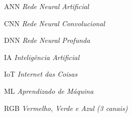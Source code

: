 \documentclass[
	12pt,				%
	oneside,
	a4paper,			%
	chapter=TITLE,
	english,			%
	brazil,				%
	]{abntex2}
\begin{document}

\frenchspacing 

\pretextual

\imprimircapa

\imprimirfolhaderosto

%











\listoffigures*
\cleardoublepage

\listoftables*
\cleardoublepage

\begin{siglas}
\item[ANN] \textit{Rede Neural Artificial}
\item[CNN] \textit{Rede Neural Convolucional}
\item[DNN] \textit{Rede Neural Profunda}
\item[IA] \textit{Inteligência Artificial}
\item[IoT] \textit{Internet das Coisas}
\item[ML] \textit{Aprendizado de Máquina}
\item[RGB] \textit{Vermelho, Verde e Azul (3 canais)}
\end{siglas}
\end{document}
